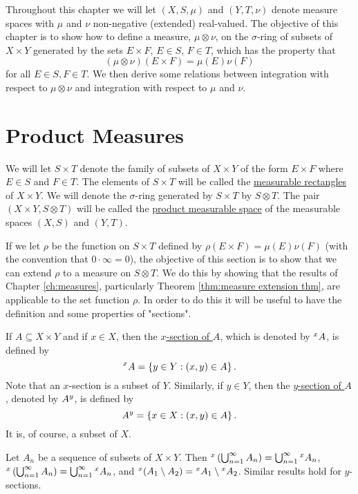 

Throughout this chapter we will let $(X,S,\mu)$ and $(Y,T,\nu)$ denote measure spaces with $\mu$ and $\nu$ non-negative (extended) real-valued. The objective of this chapter is to show how to define a measure, $\mu\otimes\nu$, on the $\sigma$-ring of subsets of $X\times Y$ generated by the sets $E\times F$, $E\in S$, $F\in T$, which has the property that $$(\mu\otimes\nu)(E\times F)=\mu(E)\nu(F)$$ for all $E\in S,F\in T$. We then derive some relations between integration with respect to $\mu\otimes\nu$ and integration with respect to $\mu$ and $\nu$.

\section{Product Measures}

\begin{definition}
We will let $S\times T$ denote the family of subsets of $X\times Y$ of the form $E\times F$ where $E\in S$ and $F\in T$. The elements of $S\times T$ will be called the \underline{measurable rectangles} of $X\times Y$. We will denote the $\sigma$-ring generated by $S\times T$ by $S\otimes T$. The pair $(X\times Y,S\otimes T)$ will be called the \underline{product measurable space} of the measurable spaces $(X,S)$ and $(Y,T)$.
\end{definition}

If we let $\rho$ be the function on $S\times T$ defined by $\rho(E\times F)=\mu(E)\nu(F)$ (with the convention that $0\cdot\infty=0$), the objective of this section is to show that we can extend $\rho$ to a measure on $S\otimes T$. We do this by showing that the results of Chapter \ref{ch:measures}, particularly Theorem \ref{thm:measure extension thm}, are applicable to the set function $\rho$. In order to do this it will be useful to have the definition and some properties of "sections".

\begin{definition}
If $A\subseteq X\times Y$ and if $x\in X$, then the \underline{$x$-section of $A$}, which is denoted by $\xsec{A}{x}$, is defined by $$\xsec{A}{x}=\brc{y\in Y:(x, y)\in A}.$$ Note that an $x$-section is a subset of $Y$. Similarly, if $y\in Y$, then the \underline{$y$-section of $A$}, denoted by $\ysec{A}{y}$, is defined by $$\ysec{A}{y}=\brc{x\in X:(x,y)\in A}.$$ It is, of course, a subset of $X$.
\end{definition}

\begin{proposition}
\label{prop:section preserve union intersection}
Let $A_n$ be a sequence of subsets of $X\times Y$. Then $\xsec{\br{\bigcup_{n=1}^\infty A_n}}{x}=\bigcup_{n=1}^\infty\xsec{A_n}{x}$, $\xsec{\br{\bigcup_{n=1}^\infty A_n}}{x}=\bigcup_{n=1}^\infty\xsec{A_n}{x}$, and $\xsec{(A_1\sd A_2)}{x}=\xsec{A_1}{x}\sd\xsec{A_2}{x}$. Similar results hold for $y$-sections.
\end{proposition}


